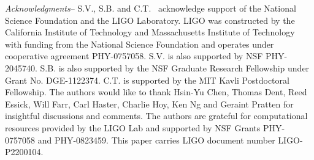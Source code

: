 \documentclass[floats,floatfix,showpacs,amssymb,prl,twocolumn,superscriptaddress,nofootinbib]{revtex4-2}
\newcommand\prlsec[1]{\vspace{2mm}\noindent \emph{#1}--}
\begin{document}
\prlsec{Acknowledgments} S.V., S.B. and C.T. \ acknowledge support of the National Science Foundation and the LIGO Laboratory. LIGO was constructed by the California Institute of Technology and Massachusetts Institute of Technology with funding from the National Science Foundation and operates under cooperative agreement PHY-0757058.
S.V. is also supported by NSF PHY-2045740.
S.B. is also supported by the NSF Graduate Research Fellowship under Grant No. DGE-1122374.
C.T. is supported by the MIT Kavli Postdoctoral Fellowship.
The authors would like to thank Hsin-Yu Chen, Thomas Dent, Reed Essick, Will Farr, Carl Haster, Charlie Hoy, Ken Ng and Geraint Pratten for insightful discussions and comments.
The authors are grateful for computational resources provided by the LIGO Lab and supported by NSF Grants PHY-0757058 and PHY-0823459.
This paper carries LIGO document number LIGO-P2200104.

\end{document}
